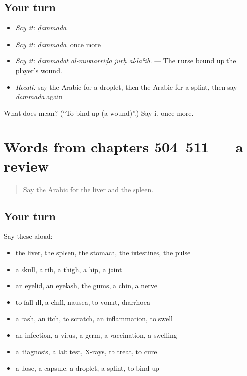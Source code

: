 \subsection*{Your turn}
\begin{itemize}
\raggedright
  \item \emph{Say it:} \emph{ḍammada}
  \item \emph{Say it:} \emph{ḍammada}, once more
  \item \emph{Say it:} \emph{ḍammadat al-mumarriḍa jurḥ al-lāʿib.} — The nurse bound up the player's wound.
  \item \emph{Recall:} say the Arabic for a droplet, then the Arabic for a splint, then say \emph{ḍammada} again
\end{itemize}

\begin{tcolorbox}[breakable,colback=teal!4,colframe=teal!35!black,title={Before you move on}]
What does  mean? (\textquotedblleft{}To bind up (a wound)\textquotedblright{}.) Say it once more.
\end{tcolorbox}
\section[(dialogue)]{Words from chapters 504–511 — a review}

\label{lesson:AR-R511-review-504-511}



\begin{quote}
Say the Arabic for the liver and the spleen.
\end{quote}

\subsection*{Your turn}
Say these aloud:

\begin{itemize}
\raggedright
  \item the liver, the spleen, the stomach, the intestines, the pulse
  \item a skull, a rib, a thigh, a hip, a joint
  \item an eyelid, an eyelash, the gums, a chin, a nerve
  \item to fall ill, a chill, nausea, to vomit, diarrhoea
  \item a rash, an itch, to scratch, an inflammation, to swell
  \item an infection, a virus, a germ, a vaccination, a swelling
  \item a diagnosis, a lab test, X-rays, to treat, to cure
  \item a dose, a capsule, a droplet, a splint, to bind up
\end{itemize}


